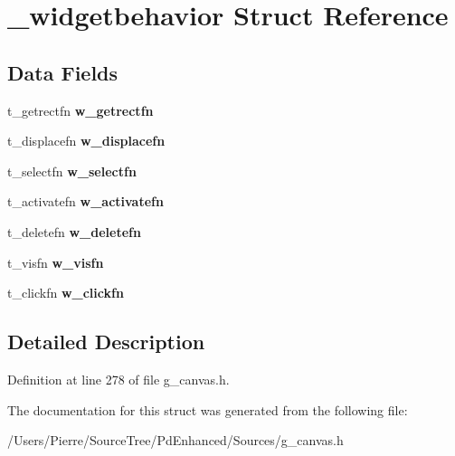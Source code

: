 \hypertarget{struct__widgetbehavior}{\section{\-\_\-widgetbehavior Struct Reference}
\label{struct__widgetbehavior}
}
\subsection*{Data Fields}
\begin{DoxyCompactItemize}
\item 
\hypertarget{struct__widgetbehavior_ae1c0ed04f382d1e9802e764a923e2d4f}{t\-\_\-getrectfn {\bfseries w\-\_\-getrectfn}}\label{struct__widgetbehavior_ae1c0ed04f382d1e9802e764a923e2d4f}

\item 
\hypertarget{struct__widgetbehavior_ade5d23ff0ed3290f9292bd3e7b1776ad}{t\-\_\-displacefn {\bfseries w\-\_\-displacefn}}\label{struct__widgetbehavior_ade5d23ff0ed3290f9292bd3e7b1776ad}

\item 
\hypertarget{struct__widgetbehavior_a7b9c0c21fc2d01d8fe20da881140c0d5}{t\-\_\-selectfn {\bfseries w\-\_\-selectfn}}\label{struct__widgetbehavior_a7b9c0c21fc2d01d8fe20da881140c0d5}

\item 
\hypertarget{struct__widgetbehavior_ade55a1f252ff2ca9edc39ee303e5ce8c}{t\-\_\-activatefn {\bfseries w\-\_\-activatefn}}\label{struct__widgetbehavior_ade55a1f252ff2ca9edc39ee303e5ce8c}

\item 
\hypertarget{struct__widgetbehavior_aa0bf43cdfe76feca7465aecc0fe8a0ab}{t\-\_\-deletefn {\bfseries w\-\_\-deletefn}}\label{struct__widgetbehavior_aa0bf43cdfe76feca7465aecc0fe8a0ab}

\item 
\hypertarget{struct__widgetbehavior_af56082f3c47e55ee39a21da9c962c01b}{t\-\_\-visfn {\bfseries w\-\_\-visfn}}\label{struct__widgetbehavior_af56082f3c47e55ee39a21da9c962c01b}

\item 
\hypertarget{struct__widgetbehavior_a8cf645322b7005bc821feaafa06d4b8d}{t\-\_\-clickfn {\bfseries w\-\_\-clickfn}}\label{struct__widgetbehavior_a8cf645322b7005bc821feaafa06d4b8d}

\end{DoxyCompactItemize}


\subsection{Detailed Description}


Definition at line 278 of file g\-\_\-canvas.\-h.



The documentation for this struct was generated from the following file\-:\begin{DoxyCompactItemize}
\item 
/\-Users/\-Pierre/\-Source\-Tree/\-Pd\-Enhanced/\-Sources/g\-\_\-canvas.\-h\end{DoxyCompactItemize}

